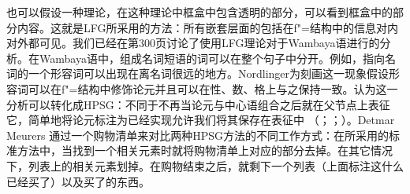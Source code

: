 也\label{page-Bender-Wambaya-two}可以假设一种理论，在这种理论中框盒中包含透明的部分，可以看到框盒中的部分内容。这就是LFG\indexlfgc 所采用的方法：所有嵌套层面的包括在f"=结构中的信息对内对外都可见。我们已经在第300页讨论了\citeyearpar{Nordlinger98a-u}使用LFG理论对于Wambaya语进行的分析。在Wambaya语中，组成名词短语的词可以在整个句子中分开。例如，指向名词的一个形容词可以出现在离名词很远的地方。Nordlinger为刻画这一现象假设形容词可以在f"=结构中修饰论元并且可以在性、数、格上与之保持一致。\citet{Bender2008a}认为这一分析可以转化成HPSG\indexhpsgc：不同于不再当论元与中心语组合之后就在父节点上表征它，简单地将论元标注为已经实现允许我们将其保存在表征中 （\citealp{Meurers99b}；\citealp{Prze99}；\citealp[\S~17.4]{MuellerLehrbuch1}）。Detmar Meurers 通过一个购物清单来对比两种HPSG方法的不同工作方式：在\citet{ps2}所采用的标准方法中，当找到一个相关元素时就将购物清单上对应的部分去掉。在其它情况下，列表上的相关元素划掉。在购物结束之后，就剩下一个列表（上面标注这什么已经买了）以及买了的东西。
  
